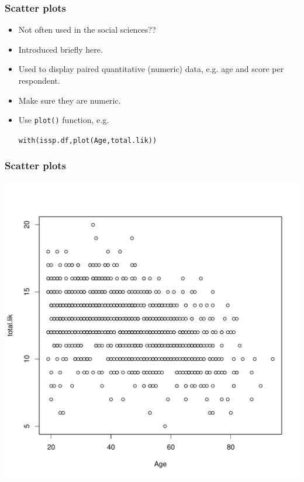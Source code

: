 \documentclass{beamer}\usepackage[]{graphicx}\usepackage[]{color}
\makeatletter
\newcommand{\hlstd}[1]{\textcolor[rgb]{0,0,0}{#1}}%
\newcommand{\hlkwd}[1]{\textcolor[rgb]{0,0.267,0.4}{#1}}%
\newenvironment{kframe}{%
 \def\at@end@of@kframe{}%
 \ifinner\ifhmode%
  \def\at@end@of@kframe{\end{minipage}}%
  \begin{minipage}{\columnwidth}%
 \fi\fi%
 \def\FrameCommand##1{\hskip\@totalleftmargin \hskip-\fboxsep
 \colorbox{shadecolor}{##1}\hskip-\fboxsep
     \hskip-\linewidth \hskip-\@totalleftmargin \hskip\columnwidth}%
 \MakeFramed {\advance\hsize-\width
   \@totalleftmargin\z@ \linewidth\hsize
   \@setminipage}}%
 {\par\unskip\endMakeFramed%
 \at@end@of@kframe}
\newenvironment{knitrout}{}{} %
\makeatother
\begin{document}
\begin{frame}[fragile]
\frametitle{Scatter plots}
\begin{itemize}
\item Not often used in the social sciences??
\item Introduced briefly here.
\item Used to display paired quantitative (numeric) data, e.g. age and score per respondent.
\item Make sure they are numeric.
\item Use \texttt{plot()} function, e.g.
\begin{knitrout}
\color{fgcolor}\begin{kframe}
\begin{alltt}
\hlkwd{with}\hlstd{(issp.df,} \hlkwd{plot}\hlstd{(Age, total.lik))}
\end{alltt}
\end{kframe}
\end{knitrout}
\end{itemize}
\end{frame}

\begin{frame}[fragile]
  \frametitle{Scatter plots}
\begin{knitrout}
\color{fgcolor}

{\centering \includegraphics[width=0.6\linewidth]{figure/scat1-1} 

}



\end{knitrout}
\end{frame}
\end{document}
